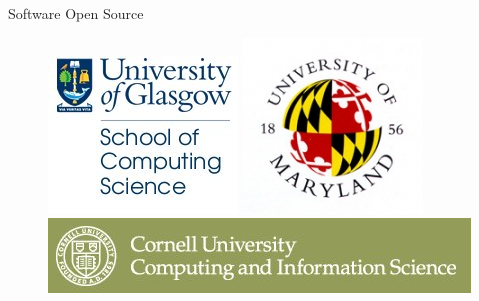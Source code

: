 \begin{frame}{Software Open Source}





   \begin{figure}[hb]
     \centering
     \includegraphics[scale=1]{CompScience_colour_stk-2.jpg}
     \includegraphics[scale=0.3]{university_of_maryland_college_park_logo2.jpg}
     \includegraphics[scale=0.3]{cornell.jpg}
     \label{fig11:fb}
   \end{figure}


\end{frame}
